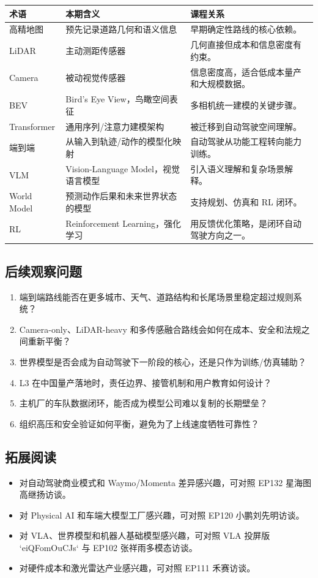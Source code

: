 \documentclass[a4paper]{article}
\begin{document}
\noindent\begin{tabularx}{\textwidth}{p{}p{}X}
\toprule
术语 & 本期含义 & 课程关系 \\
\midrule
高精地图 & 预先记录道路几何和语义信息 & 早期确定性路线的核心依赖。 \\
LiDAR & 主动测距传感器 & 几何直接但成本和信息密度有约束。 \\
Camera & 被动视觉传感器 & 信息密度高，适合低成本量产和大规模数据。 \\
BEV & Bird's Eye View，鸟瞰空间表征 & 多相机统一建模的关键步骤。 \\
Transformer & 通用序列/注意力建模架构 & 被迁移到自动驾驶空间理解。 \\
端到端 & 从输入到轨迹/动作的模型化映射 & 自动驾驶从功能工程转向能力训练。 \\
VLM & Vision-Language Model，视觉语言模型 & 引入语义理解和复杂场景解释。 \\
World Model & 预测动作后果和未来世界状态的模型 & 支持规划、仿真和 RL 闭环。 \\
RL & Reinforcement Learning，强化学习 & 用反馈优化策略，是闭环自动驾驶方向之一。 \\
\bottomrule
\end{tabularx}

\subsection{后续观察问题}

\begin{enumerate}
\item 端到端路线能否在更多城市、天气、道路结构和长尾场景里稳定超过规则系统？
\item Camera-only、LiDAR-heavy 和多传感融合路线会如何在成本、安全和法规之间重新平衡？
\item 世界模型是否会成为自动驾驶下一阶段的核心，还是只作为训练/仿真辅助？
\item L3 在中国量产落地时，责任边界、接管机制和用户教育如何设计？
\item 主机厂的车队数据闭环，能否成为模型公司难以复制的长期壁垒？
\item 组织高压和安全验证如何平衡，避免为了上线速度牺牲可靠性？
\end{enumerate}

\subsection{拓展阅读}

\begin{itemize}
\item 对自动驾驶商业模式和 Waymo/Momenta 差异感兴趣，可对照 EP132 星海图高继扬访谈。
\item 对 Physical AI 和车端大模型工厂感兴趣，可对照 EP120 小鹏刘先明访谈。
\item 对 VLA、世界模型和机器人基础模型感兴趣，可对照 VLA 投屏版 `eiQFomOuCJs` 与 EP102 张祥雨多模态访谈。
\item 对硬件成本和激光雷达产业感兴趣，可对照 EP111 禾赛访谈。
\end{itemize}
\end{document}
